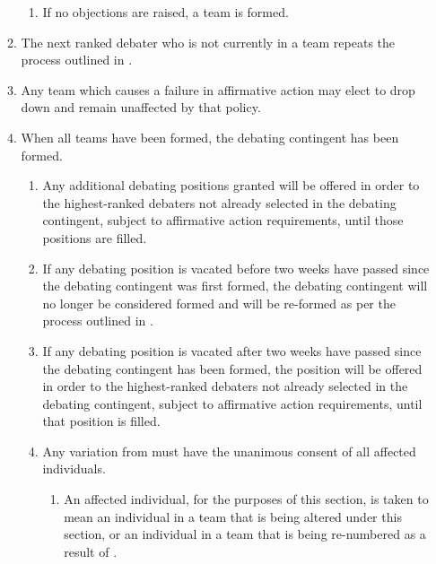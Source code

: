 \begin{enumerate}
\begin{enumerate}
\begin{enumerate}
    \item If no objections are raised, a team is formed.
    \end{enumerate}
  \item The next ranked debater who is not currently in a team repeats the process outlined in .
  \item Any team which causes a failure in affirmative action may elect to drop down and remain unaffected by that policy.
  \item When all teams have been formed, the debating contingent has been formed.
    \begin{enumerate}
    \item Any additional debating positions granted will be offered in order to the highest-ranked debaters not already selected in the debating contingent, subject to affirmative action requirements, until those positions are filled.
    \item If any debating position is vacated before two weeks have passed since the debating contingent was first formed, the debating contingent will no longer be considered formed and will be re-formed as per the process outlined in .
    \item If any debating position is vacated after two weeks have passed since the debating contingent has been formed, the position will be offered in order to the highest-ranked debaters not already selected in the debating contingent, subject to affirmative action requirements, until that position is filled. \label{delayed_wudc_speaker_vacation}
    \item Any variation from  must have the unanimous consent of all affected individuals.
      \begin{enumerate}
      \item An affected individual, for the purposes of this section, is taken to mean an individual in a team that is being altered under this section, or an individual in a team that is being re-numbered as a result of .
      \end{enumerate}
    \end{enumerate}
  \end{enumerate}


\end{enumerate}

